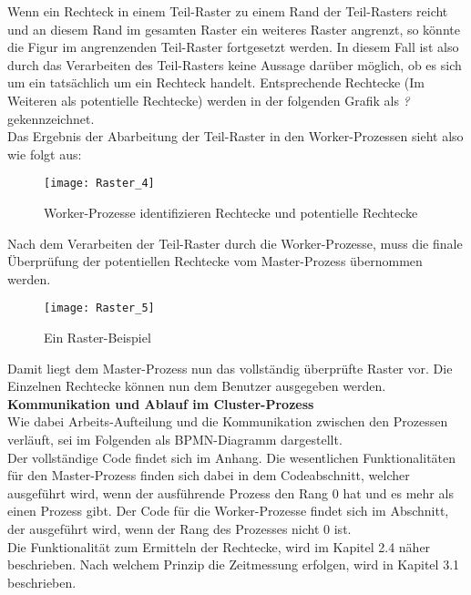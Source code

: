 \documentclass[
10pt, %
a4paper, %
oneside, %
headinclude,footinclude, %
BCOR5mm, %
]{scrartcl}
\begin{document}
Wenn ein Rechteck in einem Teil-Raster zu einem Rand der Teil-Rasters reicht und an diesem Rand im gesamten Raster ein weiteres Raster angrenzt, so könnte die Figur im angrenzenden Teil-Raster fortgesetzt werden. In diesem Fall ist also durch das Verarbeiten des Teil-Rasters keine Aussage darüber möglich, ob es sich um ein tatsächlich um ein Rechteck handelt. Entsprechende Rechtecke (Im Weiteren als potentielle Rechtecke) werden in der folgenden Grafik als \textit{?} gekennzeichnet.\\
Das Ergebnis der Abarbeitung der Teil-Raster in den Worker-Prozessen sieht also wie folgt aus:

\begin{figure}[h]
	\centering 
	\texttt{[image: Raster\_4]} 
	\caption[Cluster-Prozess: Worker-Prozess: Rechtecke und potentielle Rechtecke]{Worker-Prozesse identifizieren Rechtecke und potentielle Rechtecke}
\end{figure}

Nach dem Verarbeiten der Teil-Raster durch die Worker-Prozesse, muss die finale Überprüfung der potentiellen Rechtecke vom Master-Prozess übernommen werden.

\begin{figure}[h]
	\centering 
	\texttt{[image: Raster\_5]} 
	\caption[Cluster-Prozess: Beispiel-Raster]{Ein Raster-Beispiel }
\end{figure}

Damit liegt dem Master-Prozess nun das vollständig überprüfte Raster vor. Die Einzelnen Rechtecke können nun dem Benutzer ausgegeben werden.\\

\textbf{Kommunikation und Ablauf im Cluster-Prozess }\\
Wie dabei Arbeits-Aufteilung und die Kommunikation zwischen den Prozessen verläuft, sei im Folgenden als BPMN-Diagramm dargestellt.\\

Der vollständige Code findet sich im Anhang. Die wesentlichen Funktionalitäten für den Master-Prozess finden sich dabei in dem Codeabschnitt, welcher ausgeführt wird, wenn der ausführende Prozess den Rang 0 hat und es mehr als einen Prozess gibt. Der Code für die Worker-Prozesse findet sich im Abschnitt, der ausgeführt wird, wenn der Rang des Prozesses nicht 0 ist.\\

Die Funktionalität zum Ermitteln der Rechtecke, wird im Kapitel 2.4 näher beschrieben. Nach welchem Prinzip die Zeitmessung erfolgen, wird in Kapitel 3.1 beschrieben.
\end{document}
